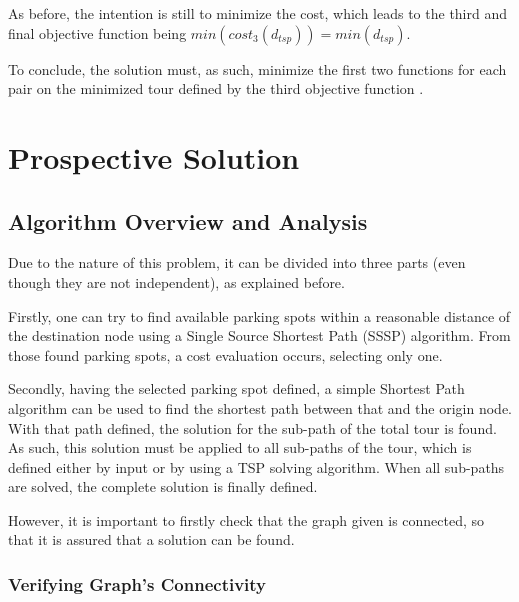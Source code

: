 \documentclass[a4paper, 12pt]{report}
\begin{document}
    As before, the intention is still to minimize the cost, which leads to the third and final objective function being $min(cost_3(d_{tsp})) = min(d_{tsp})$.
    
    To conclude, the solution must, as such, minimize the first two functions for each pair on the minimized tour defined by the third objective function \footnotemark.
    
    
        
    \chapter{Prospective Solution} \label{prosol}
    
    \section{Algorithm Overview and Analysis} \label{analysis}
    
    Due to the nature of this problem, it can be divided into three parts (even though they are not independent), as explained before.
    
    Firstly, one can try to find available parking spots within a reasonable distance of the destination node using a Single Source Shortest Path (SSSP) algorithm. From those found parking spots, a cost evaluation occurs, selecting only one.
    
    Secondly, having the selected parking spot defined, a simple Shortest Path algorithm can be used to find the shortest path between that and the origin node. With that path defined, the solution for the sub-path of the total tour is found. As such, this solution must be applied to all sub-paths of the tour, which is defined either by input or by using a TSP solving algorithm. When all sub-paths are solved, the complete solution is finally defined.
    
    However, it is important to firstly check that the graph given is connected, so that it is assured that a solution can be found.
    
    \subsection{Verifying Graph's Connectivity}
    
\end{document}
